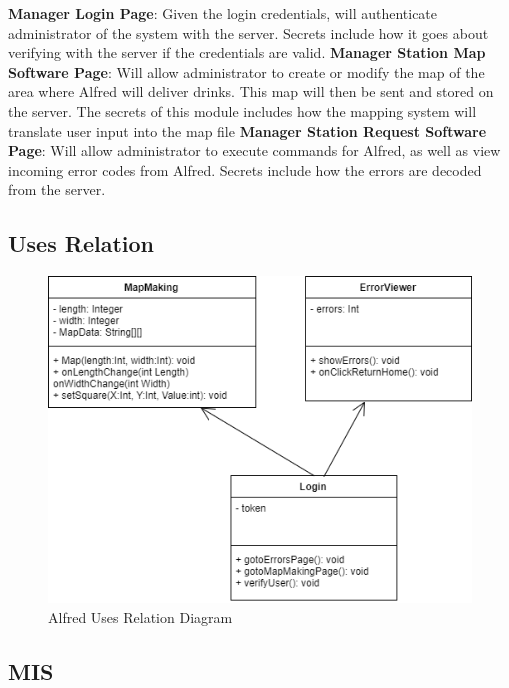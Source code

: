 \documentclass [10pt]{article}
\begin{document}
\textbf{Manager Login Page}: Given the login credentials, will authenticate administrator of the system with the server. Secrets include how it goes about verifying with the server if the credentials are valid.
\textbf{Manager Station Map Software Page}: Will allow administrator to create or modify the map of the area where Alfred will deliver drinks. This map will then be sent and stored on the server. The secrets of this module includes how the mapping system will translate user input into the map file
\textbf{Manager Station Request Software Page}: Will allow administrator to execute commands for Alfred, as well as view incoming error codes from Alfred. Secrets include how the errors are decoded from the server.


\subsection{Uses Relation}

\begin{figure} [h!]
	\centering
	\includegraphics [scale = 0.4] {figures/Manager_UsesDiagram.png}
	\caption{Alfred Uses Relation Diagram}
\end{figure}



\subsection{MIS}
\end{document}
